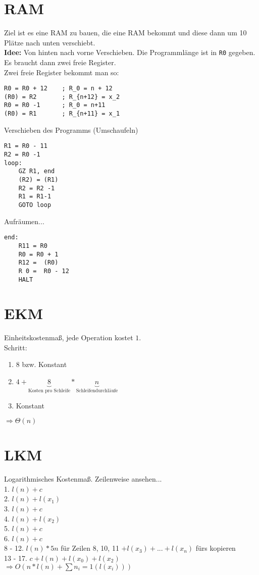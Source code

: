 \documentclass[ngerman,a4paper]{report}
\begin{document}
\section{RAM}
Ziel ist es eine RAM zu bauen, die eine RAM bekommt und diese dann um 10 Plätze nach unten verschiebt.\\
\textbf{Idee:} Von hinten nach vorne Verschieben. Die Programmlänge ist in \lstinline!R0! gegeben. Es braucht dann zwei freie Register.\\
Zwei freie Register bekommt man so:\\
\begin{lstlisting}[mathescape]
R0 = R0 + 12 	; R_0 = n + 12
(R0) = R2 		; R_{n+12} = x_2
R0 = R0 -1 		; R_0 = n+11
(R0) = R1 		; R_{n+11} = x_1
\end{lstlisting}
Verschieben des Programms (Umschaufeln)
\begin{lstlisting}
R1 = R0 - 11
R2 = R0 -1
loop:
	GZ R1, end
	(R2) = (R1)
	R2 = R2 -1
	R1 = R1-1
	GOTO loop
\end{lstlisting}
Aufräumen...
\begin{lstlisting}
end:
	R11 = R0
	R0 = R0 + 1
	R12 =  (R0)
	R 0 =  R0 - 12
	HALT
\end{lstlisting}
\section*{EKM}
Einheitskostenmaß, jede Operation kostet $1$.\\Schritt:
\begin{enumerate}
\item $8$ bzw. Konstant
\item $4 + \underbrace{8}_\text{Kosten pro Schleife} * \underbrace{n}_\text{Schleifendurchläufe}$
\item Konstant
\end{enumerate}
$\Rightarrow \Theta(n)$\\

\section*{LKM}
Logarithmisches Kostenmaß. Zeilenweise ansehen...\\
1. $l(n) + c$\\
2. $l(n) + l(x_1)$\\
3. $l(n) + c$\\
4. $l(n) + l(x_2)$\\
5. $l(n) + c$\\
6. $l(n) + c$\\
8 - 12. $l(n)*5n$ für Zeilen 8, 10, 11 $+ l(x_3)+...+l(x_n)$ fürs kopieren\\
13 - 17. $c+l(n)+l(x_0) + l(x_2)$\\
$\Rightarrow O(n*l(n) + \sum n _ i = 1 (l(x_i)))$
\end{document}
